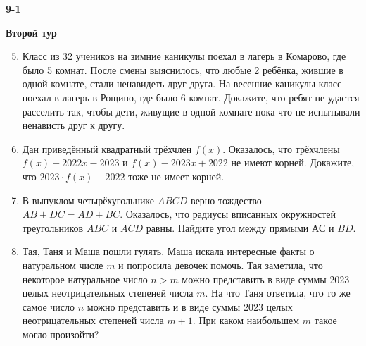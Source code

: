 \documentclass{article}
\begin{document}
\large
	
\begin{center}
	\LARGE\textbf{9-1}
\end{center}
\begin{center}
	\large\textbf{Второй тур}
\end{center}


\begin{enumerate}[label*=9.{\arabic{enumi}}]
\setcounter{enumi}{4}
\item Класс из 32 учеников на зимние каникулы поехал в лагерь в Комарово, где было 5 комнат. После смены выяснилось, что любые 2 ребёнка, жившие в одной комнате, стали ненавидеть друг друга. На весенние каникулы класс поехал в лагерь в Рощино, где было 6 комнат. Докажите, что ребят не удастся расселить так, чтобы дети, живущие в одной комнате пока что не испытывали ненависть друг к другу.

\item Дан приведённый квадратный трёхчлен $f(x)$. Оказалось, что трёхчлены $f(x) + 2022x - 2023$ и  $f(x) - 2023x + 2022$ не имеют корней. Докажите, что $2023\cdot f(x) - 2022$ тоже не имеет корней.

\item В выпуклом четырёхугольнике $ABCD$ верно тождество $AB + DC = AD + BC$. Оказалось, что радиусы вписанных окружностей треугольников $ABC$ и $ACD$ равны. Найдите угол между прямыми $АС$ и $BD$.

\item Тая, Таня и Маша пошли гулять. Маша искала интересные факты о натуральном числе $m$ и попросила девочек помочь. Тая заметила, что некоторое натуральное число $n>m$ можно представить в виде суммы 2023 целых неотрицательных степеней числа $m$. На что Таня ответила, что то же самое число $n$ можно представить и в виде суммы 2023 целых неотрицательных степеней числа $m + 1$. При каком наибольшем $m$ такое могло произойти?
\end{enumerate}
\end{document}
